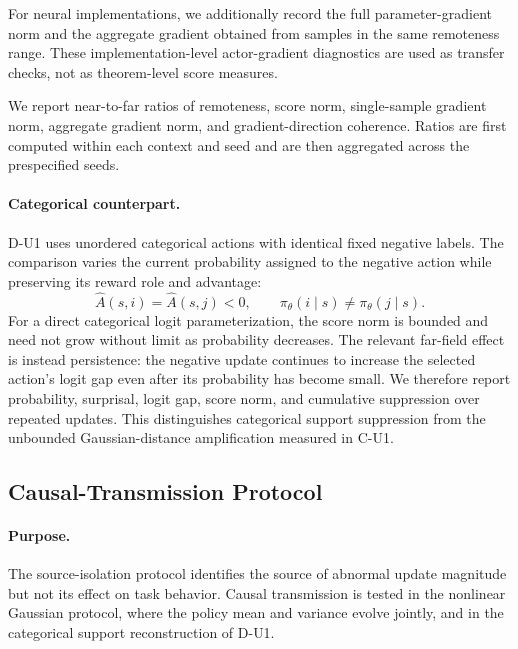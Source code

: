 \documentclass[sigconf,anonymous,review]{acmart}
\theoremstyle{acmdefinition}
\begin{document}
For neural implementations, we additionally record the full
parameter-gradient norm and the aggregate gradient obtained from samples
in the same remoteness range. These implementation-level actor-gradient
diagnostics are used as transfer checks, not as theorem-level score
measures.

We report near-to-far ratios of remoteness, score norm, single-sample
gradient norm, aggregate gradient norm, and gradient-direction
coherence. Ratios are first computed within each context and seed and
are then aggregated across the prespecified seeds.

\paragraph{Categorical counterpart.}
D-U1 uses unordered categorical actions with identical fixed negative
labels. The comparison varies the current probability assigned to the
negative action while preserving its reward role and advantage:
\begin{equation}
    \widehat A(s,i)
    =
    \widehat A(s,j)
    <0,
    \qquad
    \pi_\theta(i\mid s)
    \neq
    \pi_\theta(j\mid s).
    \label{eq:categorical_source_match}
\end{equation}
For a direct categorical logit parameterization, the score norm is
bounded and need not grow without limit as probability decreases.
The relevant far-field effect is instead persistence: the negative
update continues to increase the selected action's logit gap even after
its probability has become small. We therefore report probability,
surprisal, logit gap, score norm, and cumulative suppression over
repeated updates. This distinguishes categorical support suppression
from the unbounded Gaussian-distance amplification measured in C-U1.


\subsection{Causal-Transmission Protocol}
\label{app:causal_transmission_protocol}

\paragraph{Purpose.}
The source-isolation protocol identifies the source of abnormal update
magnitude but not its effect on task behavior. Causal transmission is tested in the nonlinear
Gaussian protocol, where the policy mean and variance evolve jointly,
and in the categorical support reconstruction of D-U1.
\end{document}
